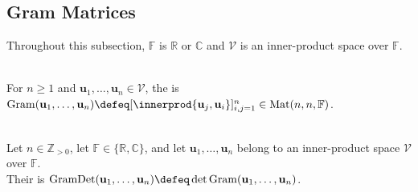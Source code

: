 \subsection{Gram Matrices}

Throughout this subsection, $\mathbb{F}$ is $\mathbb{R}$ or $\mathbb{C}$ and $\mathcal{V}$ is an inner-product space over $\mathbb{F}$.

\begin{definition} \label{def:gram-matrix} \\
For $n\geq1$ and $\mathbf{u}_1,\ldots,\mathbf{u}_n\in\mathcal{V}$, the  is $\operatorname{Gram}(\mathbf{u}_1,\ldots,\mathbf{u}_n)\defeq[\innerprod{\mathbf{u}_j,\mathbf{u}_i}]_{i,j=1}^{n}\in\operatorname{Mat}(n,n,\mathbb{F})$.
\end{definition}

\begin{definition} \label{def:gram-determinant} \\
Let $n\in\mathbb{Z}_{>0}$, let $\mathbb{F}\in\{\mathbb{R},\mathbb{C}\}$, and let $\mathbf{u}_1,\ldots,\mathbf{u}_n$ belong to an inner-product space $\mathcal{V}$ over $\mathbb{F}$.\\
Their  is $\operatorname{GramDet}(\mathbf{u}_1,\ldots,\mathbf{u}_n)\defeq\det\operatorname{Gram}(\mathbf{u}_1,\ldots,\mathbf{u}_n)$.
\end{definition}

